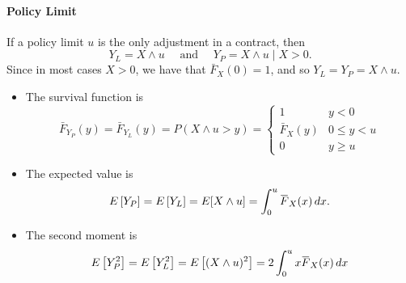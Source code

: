 \documentclass[notoc,notitlepage]{tufte-book}
\begin{document}
\paragraph{Policy Limit} If a policy limit $u$ is the only adjustment in a contract, then
\begin{equation*}
  Y_L = X \land u \quad \text{ and } \quad Y_P = X \land u \mid X > 0.
\end{equation*}
Since in most cases $X > 0$, we have that $\bar{F}_X(0) = 1$, and so $Y_L = Y_P = X \land u$.
\begin{itemize}
  \item The survival function is
    \begin{equation*}
      \bar{F}_{Y_P} (y) = \bar{F}_{Y_L} (y) = P ( X \land u > y ) = \begin{cases}
        1            & y < 0 \\
        \bar{F}_X(y) & 0 \leq y < u \\
        0            & y \geq u
      \end{cases}
    \end{equation*}
  \item The expected value is
    \begin{equation*}
      E \left[ Y_P \right] = E \left[ Y_L \right] = E [ X \land u ] = \int_{0}^{u} \bar{F}_X(x) \dif{x}.
    \end{equation*}
  \item The second moment is
    \begin{equation*}
      E \left[ Y_P^2 \right] = E \left[ Y_L^2 \right] = E \left[ (X \land u)^2 \right] = 2 \int_{0}^{u} x \bar{F}_X(x) \dif{x}
    \end{equation*}
\end{itemize}
\end{document}
